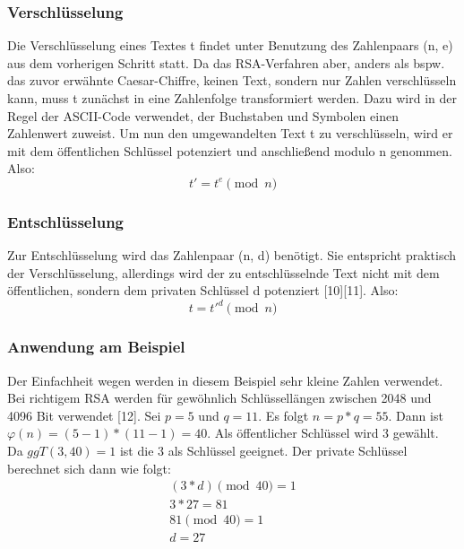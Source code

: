 \documentclass[conference,10pt,a4paper,twocolumn]{IEEEtran}
\begin{document}
\bigskip
\subsubsection{Verschlüsselung}
Die Verschlüsselung eines Textes t findet unter Benutzung des Zahlenpaars (n, e) aus dem vorherigen Schritt statt. Da das RSA-Verfahren aber, anders als bspw. das zuvor erwähnte Caesar-Chiffre, keinen Text, sondern nur Zahlen verschlüsseln kann, muss t zunächst in eine Zahlenfolge transformiert werden. Dazu wird in der Regel der ASCII-Code verwendet, der Buchstaben und Symbolen einen Zahlenwert zuweist. Um nun den umgewandelten Text t zu verschlüsseln, wird er mit dem öffentlichen Schlüssel potenziert und anschließend modulo n genommen. Also:
\begin{equation}
t' = t^e \pmod n
\end{equation}

\bigskip
\subsubsection{Entschlüsselung}
Zur Entschlüsselung wird das Zahlenpaar (n, d) benötigt. Sie entspricht praktisch der Verschlüsselung, allerdings wird der zu entschlüsselnde Text nicht mit dem öffentlichen, sondern dem privaten Schlüssel d potenziert [10][11]. Also:
\begin{equation}
t = t'^d \pmod n
\end{equation}

\bigskip
\subsubsection{Anwendung am Beispiel}
Der Einfachheit wegen werden in diesem Beispiel sehr kleine Zahlen verwendet. Bei richtigem RSA werden für gewöhnlich Schlüssellängen zwischen 2048 und 4096 Bit verwendet [12]. \linebreak
Sei \begin{math}p = 5\end{math} und \begin{math}q = 11\end{math}. Es folgt \begin{math}n = p * q = 55\end{math}. \linebreak
Dann ist \begin{math} \varphi(n) = (5 -1) * (11 - 1) = 40 \end{math}. Als öffentlicher Schlüssel wird 3 gewählt. Da \begin{math} ggT(3, 40) = 1 \end{math} ist die 3 als Schlüssel geeignet. Der private Schlüssel berechnet sich dann wie folgt: \linebreak 
\begin{gather}
(3 * d) \pmod{40} = 1\\
3 * 27 = 81\\
81 \pmod{40} = 1\\
d = 27
\end{gather}
\end{document}
